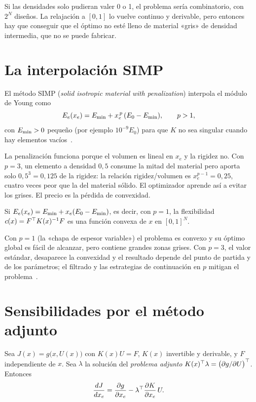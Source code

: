Si las densidades solo pudieran valer 0 o 1, el problema sería combinatorio, con $2^N$ diseños. La relajación a $[0,1]$ lo vuelve continuo y derivable, pero entonces hay que conseguir que el óptimo no esté lleno de material «gris» de densidad intermedia, que no se puede fabricar.

\section{La interpolación SIMP}

\begin{definicion}\label{def:simp}
El método SIMP (\emph{solid isotropic material with penalization}) interpola el módulo de Young como
\[
E_e(x_e)=E_{\min}+x_e^{\,p}\,(E_0-E_{\min}),\qquad p>1,
\]
con $E_{\min}>0$ pequeño (por ejemplo $10^{-9}E_0$) para que $K$ no sea singular cuando hay elementos vacíos~\cite[§2.1]{andreassen}.
\end{definicion}

La penalización funciona porque el volumen es lineal en $x_e$ y la rigidez no. Con $p=3$, un elemento a densidad $0{,}5$ consume la mitad del material pero aporta solo $0{,}5^3=0{,}125$ de la rigidez: la relación rigidez/volumen es $x_e^{p-1}=0{,}25$, cuatro veces peor que la del material sólido. El optimizador aprende así a evitar los grises. El precio es la pérdida de convexidad.

\begin{teorema}[Convexidad con $p=1$]\label{teo:convexo}
Si $E_e(x_e)=E_{\min}+x_e(E_0-E_{\min})$, es decir, con $p=1$, la flexibilidad $c(x)=F^\top K(x)^{-1}F$ es una función convexa de $x$ en $[0,1]^N$.
\end{teorema}

Con $p=1$ (la «chapa de espesor variable») el problema es convexo y su óptimo global es fácil de alcanzar, pero contiene grandes zonas grises. Con $p=3$, el valor estándar, desaparece la convexidad y el resultado depende del punto de partida y de los parámetros; el filtrado y las estrategias de continuación en $p$ mitigan el problema~\cite{sigpet}.

\section{Sensibilidades por el método adjunto}

\begin{teorema}\label{teo:adjunto}
Sea $J(x)=g\bigl(x,U(x)\bigr)$ con $K(x)U=F$, $K(x)$ invertible y derivable, y $F$ independiente de $x$. Sea $\lambda$ la solución del \emph{problema adjunto} $K(x)^\top\lambda=\bigl(\partial g/\partial U\bigr)^\top$. Entonces
\[
\frac{dJ}{dx_e}=\frac{\partial g}{\partial x_e}-\lambda^\top\frac{\partial K}{\partial x_e}\,U .
\]
\end{teorema}


